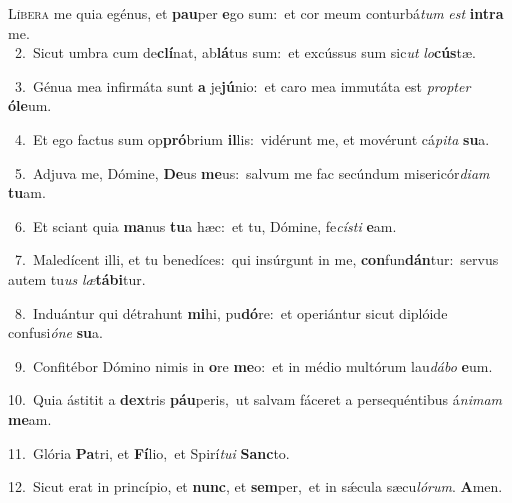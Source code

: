 \lettrine{\initial\textcolor{\initialcolor}{L}}{íbera} me quia egénus, et \textbf{pau}\-per \textbf{e}\-go sum:~\star et cor meum conturbá\textit{tum} \textit{est} \textbf{in}\-\textbf{tra} me.\\
{\numbfont\textcolor{\numbcolor}{~2.}}~Sicut umbra cum de\-\textbf{clí}\-nat, ab\-\textbf{lá}\-tus sum:~\star et excússus sum sic\textit{ut} \textit{lo}\-\textbf{cús}tæ.\par
{\numbfont\textcolor{\numbcolor}{~3.}}~Génua mea infirmáta sunt \textbf{a} je\-\textbf{jú}\-nio:~\star et caro mea immutáta est \textit{prop}\-\textit{ter} \textbf{ó}\-\textbf{le}um.\par
{\numbfont\textcolor{\numbcolor}{~4.}}~Et ego factus sum op\-\textbf{pró}\-brium \textbf{il}\-lis:~\star vidérunt me, et movérunt cá\-\textit{pi}\-\textit{ta} \textbf{su}\-a.\par
{\numbfont\textcolor{\numbcolor}{~5.}}~Adjuva me, Dómine, \textbf{De}\-us \textbf{me}\-us:~\star salvum me fac secúndum misericór\-\textit{di}\-\textit{am} \textbf{tu}\-am.\par
{\numbfont\textcolor{\numbcolor}{~6.}}~Et sciant quia \textbf{ma}\-nus \textbf{tu}\-a hæc:~\star et tu, Dómine, fe\-\textit{cís}\-\textit{ti} \textbf{e}\-am.\par
{\numbfont\textcolor{\numbcolor}{~7.}}~Maledícent illi, et tu benedíces:~\dagger qui insúrgunt in me, \textbf{con}\-fun\-\textbf{dán}\-tur:~\star servus autem tu\textit{us} \textit{læ}\-\textbf{tá}\textbf{bi}tur.\par
{\numbfont\textcolor{\numbcolor}{~8.}}~Induántur qui détrahunt \textbf{mi}\-hi, pu\-\textbf{dó}\-re:~\star et operiántur sicut diplóide confusi\-\textit{ó}\-\textit{ne} \textbf{su}\-a.\par
{\numbfont\textcolor{\numbcolor}{~9.}}~Confitébor Dómino nimis in \textbf{o}\-re \textbf{me}\-o:~\star et in médio multórum lau\-\textit{dá}\-\textit{bo} \textbf{e}\-um.\par
{\numbfont\textcolor{\numbcolor}{10.}}~Quia ástitit a \textbf{dex}\-tris \textbf{páu}\-peris,~\star ut salvam fáceret a persequéntibus á\-\textit{ni}\-\textit{mam} \textbf{me}\-am.\par
{\numbfont\textcolor{\numbcolor}{11.}}~Glória \textbf{Pa}\-tri, et \textbf{Fí}\-lio,~\star et Spirí\-\textit{tu}\-\textit{i} \textbf{Sanc}\-to.\par
{\numbfont\textcolor{\numbcolor}{12.}}~Sicut erat in princípio, et \textbf{nunc}\-, et \textbf{sem}\-per,~\star et in sǽcula sæcu\-\textit{ló}\-\textit{rum}. \textbf{A}\-men.\par
